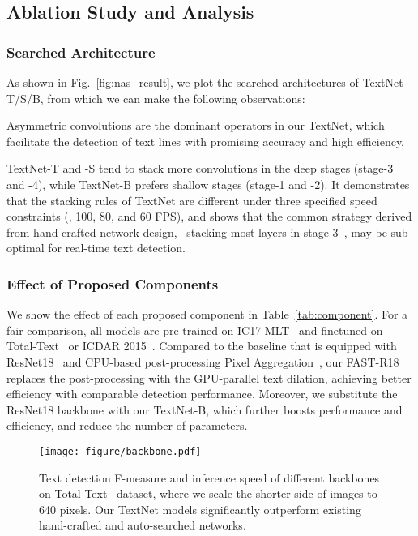 \documentclass[lettersize,journal]{IEEEtran}
\begin{document}
\subsection{Ablation Study and Analysis} 

\subsubsection{Searched Architecture}
As shown in Fig.~\ref{fig:nas_result}, we plot the searched architectures of TextNet-T/S/B, 
from which we can make the following observations:

   Asymmetric convolutions are the dominant operators in our TextNet, which facilitate the detection of text lines with promising accuracy and high efficiency.


   TextNet-T and -S tend to stack more convolutions in the deep stages (stage-3 and -4), while TextNet-B prefers shallow stages (stage-1 and -2). 
It demonstrates that the stacking rules of TextNet are different under three specified speed constraints (\ie, 100, 80, and 60 FPS),
and shows that the common strategy derived from hand-crafted network design, \ie\ stacking most layers in stage-3~\cite{he2016deep,wang2021pvtv2,wang2022internimage}, may be sub-optimal for real-time text detection.

\subsubsection{Effect of Proposed Components}
We show the effect of each proposed component in Table~\ref{tab:component}. 
For a fair comparison, all models are pre-trained on IC17-MLT~\cite{nayef2017icdar2017} and finetuned on Total-Text~\cite{ch2017total} or ICDAR 2015~\cite{karatzas2015icdar}.
Compared to the baseline that is equipped with ResNet18~\cite{he2016deep} and CPU-based post-processing Pixel Aggregation~\cite{wang2019efficient}, our FAST-R18 replaces the post-processing with the GPU-parallel text dilation, achieving better efficiency with comparable detection performance.  
Moreover, we substitute the ResNet18 backbone with our TextNet-B, which further boosts performance and efficiency, and reduce the number of parameters.



\begin{figure}[t]
\texttt{[image: figure/backbone.pdf]}
    \caption{
    Text detection F-measure and inference speed of different backbones on Total-Text~\cite{ch2017total} dataset, where we scale the shorter side of images to 640 pixels.
    Our TextNet models significantly outperform existing hand-crafted and auto-searched networks.
    }
\label{fig:backbone}
\end{figure}
\end{document}

